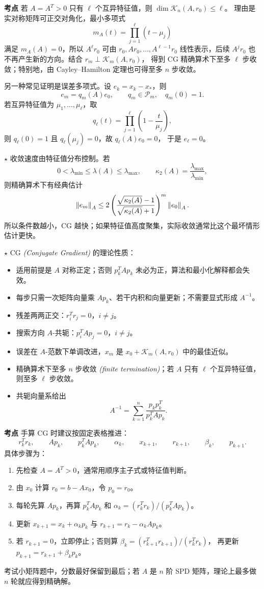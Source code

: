 \documentclass{article}
\newcommand{\keypoint}{\textcolor{red!65!black}{\textbf{$\star$}}}
\newcommand{\exam}{\textcolor{red!65!black}{\textbf{考点}}}
\newcommand{\eng}[1]{\texorpdfstring{{\normalfont\rmfamily\itshape\textcolor{blue!65!black}{(#1)}}}{(#1)}}
\begin{document}
\exam{} 若 $A=A^T>0$ 只有 $\ell$ 个互异特征值，则 $\dim \mathcal K_n(A,r_0)\le \ell$。
理由是实对称矩阵可正交对角化，最小多项式
\[
  m_A(t)=\prod_{j=1}^{\ell}(t-\mu_j)
\]
满足 $m_A(A)=0$，所以 $A^\ell r_0$ 可由 $r_0,Ar_0,\dots,A^{\ell-1}r_0$
线性表示，后续 $A^j r_0$ 也不再产生新的方向。结合 $r_m\perp\mathcal K_m(A,r_0)$，
得到 CG 精确算术下至多 $\ell$ 步收敛；特别地，由 Cayley--Hamilton 定理也可得至多 $n$ 步收敛。

另一种常见证明是误差多项式。设 $e_k=x_k-x_*$，则
\[
  e_m=q_m(A)e_0,\qquad q_m\in\mathcal P_m,\quad q_m(0)=1.
\]
若互异特征值为 $\mu_1,\dots,\mu_\ell$，取
\[
  q_\ell(t)=\prod_{j=1}^{\ell}\left(1-\frac{t}{\mu_j}\right),
\]
则 $q_\ell(0)=1$ 且 $q_\ell(\mu_j)=0$，故 $q_\ell(A)e_0=0$，
于是 $e_\ell=0$。

\keypoint{} 收敛速度由特征值分布控制。若
\[
  0<\lambda_{\min}\le\lambda(A)\le\lambda_{\max},\qquad
  \kappa_2(A)=\frac{\lambda_{\max}}{\lambda_{\min}},
\]
则精确算术下有经典估计
\[
  \left\| e_m \right\|_A
  \le
  2\left(\frac{\sqrt{\kappa_2(A)}-1}{\sqrt{\kappa_2(A)}+1}\right)^m
  \left\| e_0 \right\|_A.
\]
所以条件数越小，CG 越快；如果特征值高度聚集，实际收敛通常比这个最坏情形估计更快。

\keypoint{} CG \eng{Conjugate Gradient} 的理论性质：
\begin{itemize}
  \item 适用前提是 $A$ 对称正定；否则 $p_k^TAp_k$ 未必为正，算法和最小化解释都会失效。
  \item 每步只需一次矩阵向量乘 $Ap_k$、若干内积和向量更新；不需要显式形成 $A^{-1}$。
  \item 残差两两正交：$r_i^Tr_j=0$，$i\ne j$。
  \item 搜索方向 $A$-共轭：$p_i^TAp_j=0$，$i\ne j$。
  \item 误差在 $A$-范数下单调改进，$x_m$ 是 $x_0+\mathcal K_m(A,r_0)$ 中的最佳近似。
  \item 精确算术下至多 $n$ 步收敛 \eng{finite termination}；若 $A$ 只有 $\ell$ 个互异特征值，则至多 $\ell$ 步收敛。
  \item 共轭向量系给出
  \[
    A^{-1}=\sum_{k=1}^n\frac{p_kp_k^T}{p_k^TAp_k}.
  \]
\end{itemize}

\exam{} 手算 CG 时建议按固定表格推进：
\[
  r_k^Tr_k,\qquad Ap_k,\qquad p_k^TAp_k,\qquad
  \alpha_k,\qquad x_{k+1},\qquad r_{k+1},\qquad
  \beta_k,\qquad p_{k+1}.
\]
具体步骤为：
\begin{enumerate}
  \item 先检查 $A=A^T>0$，通常用顺序主子式或特征值判断。
  \item 由 $x_0$ 计算 $r_0=b-Ax_0$，令 $p_0=r_0$。
  \item 每轮先算 $Ap_k$，再算 $p_k^TAp_k$ 和
  $\alpha_k=(r_k^Tr_k)/(p_k^TAp_k)$。
  \item 更新 $x_{k+1}=x_k+\alpha_kp_k$ 与
  $r_{k+1}=r_k-\alpha_kAp_k$。
  \item 若 $r_{k+1}=0$，立即停止；否则算
  $\beta_k=(r_{k+1}^Tr_{k+1})/(r_k^Tr_k)$，
  再更新 $p_{k+1}=r_{k+1}+\beta_kp_k$。
\end{enumerate}
考试小矩阵题中，分数最好保留到最后；若 $A$ 是 $n$ 阶 SPD 矩阵，理论上最多做
$n$ 轮就应得到精确解。
\end{document}
